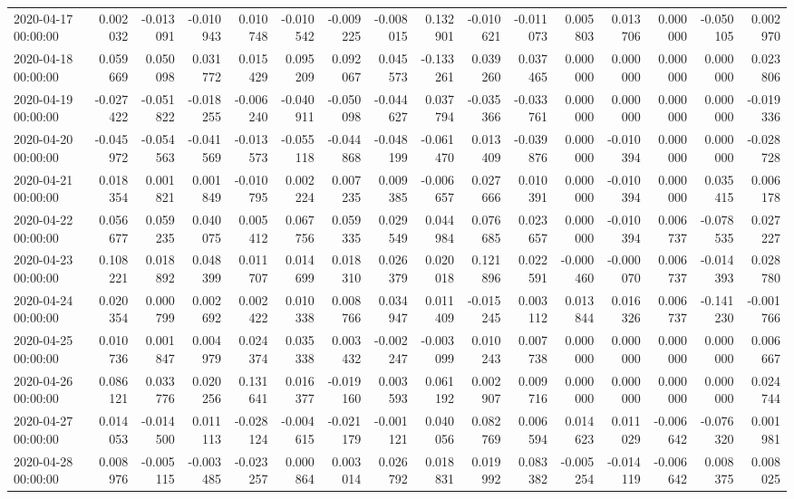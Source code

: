 \begin{tabular}{lrrrrrrrrrrrrrrr}
2020-04-17 00:00:00 & 0.002032 & -0.013091 & -0.010943 & 0.010748 & -0.010542 & -0.009225 & -0.008015 & 0.132901 & -0.010621 & -0.011073 & 0.005803 & 0.013706 & 0.000000 & -0.050105 & 0.002970 \\
2020-04-18 00:00:00 & 0.059669 & 0.050098 & 0.031772 & 0.015429 & 0.095209 & 0.092067 & 0.045573 & -0.133261 & 0.039260 & 0.037465 & 0.000000 & 0.000000 & 0.000000 & 0.000000 & 0.023806 \\
2020-04-19 00:00:00 & -0.027422 & -0.051822 & -0.018255 & -0.006240 & -0.040911 & -0.050098 & -0.044627 & 0.037794 & -0.035366 & -0.033761 & 0.000000 & 0.000000 & 0.000000 & 0.000000 & -0.019336 \\
2020-04-20 00:00:00 & -0.045972 & -0.054563 & -0.041569 & -0.013573 & -0.055118 & -0.044868 & -0.048199 & -0.061470 & 0.013409 & -0.039876 & 0.000000 & -0.010394 & 0.000000 & 0.000000 & -0.028728 \\
2020-04-21 00:00:00 & 0.018354 & 0.001821 & 0.001849 & -0.010795 & 0.002224 & 0.007235 & 0.009385 & -0.006657 & 0.027666 & 0.010391 & 0.000000 & -0.010394 & 0.000000 & 0.035415 & 0.006178 \\
2020-04-22 00:00:00 & 0.056677 & 0.059235 & 0.040075 & 0.005412 & 0.067756 & 0.059335 & 0.029549 & 0.044984 & 0.076685 & 0.023657 & 0.000000 & -0.010394 & 0.006737 & -0.078535 & 0.027227 \\
2020-04-23 00:00:00 & 0.108221 & 0.018892 & 0.048399 & 0.011707 & 0.014699 & 0.018310 & 0.026379 & 0.020018 & 0.121896 & 0.022591 & -0.000460 & -0.000070 & 0.006737 & -0.014393 & 0.028780 \\
2020-04-24 00:00:00 & 0.020354 & 0.000799 & 0.002692 & 0.002422 & 0.010338 & 0.008766 & 0.034947 & 0.011409 & -0.015245 & 0.003112 & 0.013844 & 0.016326 & 0.006737 & -0.141230 & -0.001766 \\
2020-04-25 00:00:00 & 0.010736 & 0.001847 & 0.004979 & 0.024374 & 0.035338 & 0.003432 & -0.002247 & -0.003099 & 0.010243 & 0.007738 & 0.000000 & 0.000000 & 0.000000 & 0.000000 & 0.006667 \\
2020-04-26 00:00:00 & 0.086121 & 0.033776 & 0.020256 & 0.131641 & 0.016377 & -0.019160 & 0.003593 & 0.061192 & 0.002907 & 0.009716 & 0.000000 & 0.000000 & 0.000000 & 0.000000 & 0.024744 \\
2020-04-27 00:00:00 & 0.014053 & -0.014500 & 0.011113 & -0.028124 & -0.004615 & -0.021179 & -0.001121 & 0.040056 & 0.082769 & 0.006594 & 0.014623 & 0.011029 & -0.006642 & -0.076320 & 0.001981 \\
2020-04-28 00:00:00 & 0.008976 & -0.005115 & -0.003485 & -0.023257 & 0.000864 & 0.003014 & 0.026792 & 0.018831 & 0.019992 & 0.083382 & -0.005254 & -0.014119 & -0.006642 & 0.008375 & 0.008025 \\

\end{tabular}
